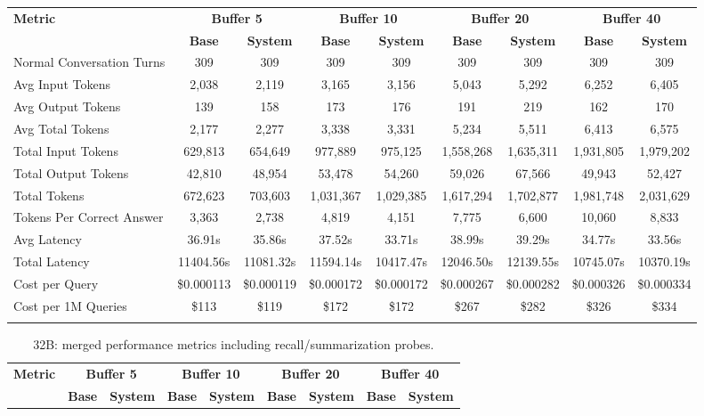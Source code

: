 \documentclass[pdflatex,sn-mathphys-num]{sn-jnl}%
\theoremstyle{thmstyleone}%
\theoremstyle{thmstyletwo}%
\theoremstyle{thmstylethree}%
\begin{document}
\begin{appendices}
\begin{landscape}
\begin{longtable}{@{}p{3.8cm}cccccccc@{}}
\toprule
\textbf{Metric} & \multicolumn{2}{c}{\textbf{Buffer 5}} & \multicolumn{2}{c}{\textbf{Buffer 10}} & \multicolumn{2}{c}{\textbf{Buffer 20}} & \multicolumn{2}{c}{\textbf{Buffer 40}} \\
\cmidrule(lr){2-3}\cmidrule(lr){4-5}\cmidrule(lr){6-7}\cmidrule(lr){8-9}
 & \textbf{Base} & \textbf{System} & \textbf{Base} & \textbf{System} & \textbf{Base} & \textbf{System} & \textbf{Base} & \textbf{System} \\
\midrule
\endhead
Normal Conversation Turns & 309 & 309 & 309 & 309 & 309 & 309 & 309 & 309 \\
Avg Input Tokens & 2,038 & 2,119 & 3,165 & 3,156 & 5,043 & 5,292 & 6,252 & 6,405 \\
Avg Output Tokens & 139 & 158 & 173 & 176 & 191 & 219 & 162 & 170 \\
Avg Total Tokens & 2,177 & 2,277 & 3,338 & 3,331 & 5,234 & 5,511 & 6,413 & 6,575 \\
Total Input Tokens & 629,813 & 654,649 & 977,889 & 975,125 & 1,558,268 & 1,635,311 & 1,931,805 & 1,979,202 \\
Total Output Tokens & 42,810 & 48,954 & 53,478 & 54,260 & 59,026 & 67,566 & 49,943 & 52,427 \\
Total Tokens & 672,623 & 703,603 & 1,031,367 & 1,029,385 & 1,617,294 & 1,702,877 & 1,981,748 & 2,031,629 \\
Tokens Per Correct Answer & 3,363 & 2,738 & 4,819 & 4,151 & 7,775 & 6,600 & 10,060 & 8,833 \\
Avg Latency & 36.91s & 35.86s & 37.52s & 33.71s & 38.99s & 39.29s & 34.77s & 33.56s \\
Total Latency & 11404.56s & 11081.32s & 11594.14s & 10417.47s & 12046.50s & 12139.55s & 10745.07s & 10370.19s \\
Cost per Query & \$0.000113 & \$0.000119 & \$0.000172 & \$0.000172 & \$0.000267 & \$0.000282 & \$0.000326 & \$0.000334 \\
Cost per 1M Queries & \$113 & \$119 & \$172 & \$172 & \$267 & \$282 & \$326 & \$334 \\
\botrule
\end{longtable}
\normalsize
\end{landscape}
\begin{landscape}
\tiny
\begin{longtable}{@{}p{3.8cm}cccccccc@{}}
\caption{32B: merged performance metrics including recall/summarization probes.}\label{tab:app_32b_perf_probe}\\

\toprule
\textbf{Metric} & \multicolumn{2}{c}{\textbf{Buffer 5}} & \multicolumn{2}{c}{\textbf{Buffer 10}} & \multicolumn{2}{c}{\textbf{Buffer 20}} & \multicolumn{2}{c}{\textbf{Buffer 40}} \\
\cmidrule(lr){2-3}\cmidrule(lr){4-5}\cmidrule(lr){6-7}\cmidrule(lr){8-9}
 & \textbf{Base} & \textbf{System} & \textbf{Base} & \textbf{System} & \textbf{Base} & \textbf{System} & \textbf{Base} & \textbf{System} \\
\midrule
\endfirsthead


\end{longtable}
\end{landscape}
\end{appendices}
\end{document}
